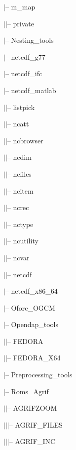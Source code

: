 $|$-- m\_map

$|$\hspace{0.5cm}$|$-- private

$|$-- Nesting\_tools

$|$-- netcdf\_g77

$|$-- netcdf\_ifc

$|$-- netcdf\_matlab

$|$\hspace{0.5cm}$|$-- listpick

$|$\hspace{0.5cm}$|$-- ncatt

$|$\hspace{0.5cm}$|$-- ncbrowser

$|$\hspace{0.5cm}$|$-- ncdim

$|$\hspace{0.5cm}$|$-- ncfiles

$|$\hspace{0.5cm}$|$-- ncitem

$|$\hspace{0.5cm}$|$-- ncrec

$|$\hspace{0.5cm}$|$-- nctype

$|$\hspace{0.5cm}$|$-- ncutility

$|$\hspace{0.5cm}$|$-- ncvar

$|$\hspace{0.5cm}$|$-- netcdf

$|$-- netcdf\_x86\_64

$|$-- Oforc\_OGCM

$|$-- Opendap\_tools

$|$\hspace{0.5cm}$|$-- FEDORA

$|$\hspace{0.5cm}$|$-- FEDORA\_X64

$|$-- Preprocessing\_tools

$|$-- Roms\_Agrif

$|$\hspace{0.5cm}$|$-- AGRIFZOOM

$|$\hspace{0.5cm}$|$\hspace{0.5cm}$|$-- AGRIF\_FILES

$|$\hspace{0.5cm}$|$\hspace{0.5cm}$|$-- AGRIF\_INC

